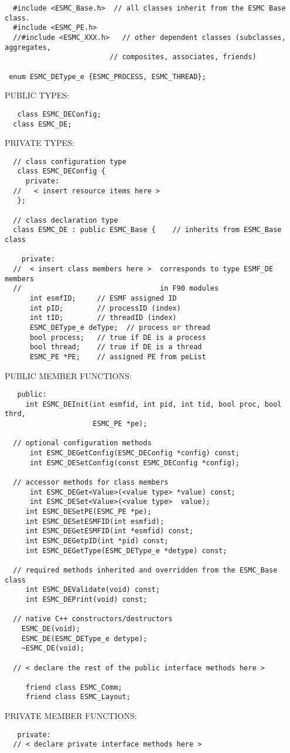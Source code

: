 \begin{verbatim}  #include <ESMC_Base.h>  // all classes inherit from the ESMC Base class.
  #include <ESMC_PE.h> 
  //#include <ESMC_XXX.h>   // other dependent classes (subclasses, aggregates,
                         // composites, associates, friends)
 
 enum ESMC_DEType_e {ESMC_PROCESS, ESMC_THREAD};
 \end{verbatim}{\sf PUBLIC TYPES:}
\begin{verbatim}   class ESMC_DEConfig;
  class ESMC_DE;
 \end{verbatim}{\sf PRIVATE TYPES:}
\begin{verbatim} 
  // class configuration type
   class ESMC_DEConfig {
     private:
  //   < insert resource items here >
   };
 
  // class declaration type
  class ESMC_DE : public ESMC_Base {    // inherits from ESMC_Base class
 
    private:
  //  < insert class members here >  corresponds to type ESMF_DE members
  //                                 in F90 modules
      int esmfID;     // ESMF assigned ID
      int pID;        // processID (index)
      int tID;        // threadID (index)
      ESMC_DEType_e deType;  // process or thread
      bool process;   // true if DE is a process
      bool thread;    // true if DE is a thread
      ESMC_PE *PE;    // assigned PE from peList
 \end{verbatim}{\sf PUBLIC MEMBER FUNCTIONS:}
\begin{verbatim}   public:
     int ESMC_DEInit(int esmfid, int pid, int tid, bool proc, bool thrd,
                     ESMC_PE *pe);
 
  // optional configuration methods
      int ESMC_DEGetConfig(ESMC_DEConfig *config) const;
      int ESMC_DESetConfig(const ESMC_DEConfig *config);
 
  // accessor methods for class members
      int ESMC_DEGet<Value>(<value type> *value) const;
      int ESMC_DESet<Value>(<value type>  value);
     int ESMC_DESetPE(ESMC_PE *pe);
     int ESMC_DESetESMFID(int esmfid);
     int ESMC_DEGetESMFID(int *esmfid) const;
     int ESMC_DEGetpID(int *pid) const;
     int ESMC_DEGetType(ESMC_DEType_e *detype) const;
     
  // required methods inherited and overridden from the ESMC_Base class
     int ESMC_DEValidate(void) const;
     int ESMC_DEPrint(void) const;
 
  // native C++ constructors/destructors
 	ESMC_DE(void);
 	ESMC_DE(ESMC_DEType_e detype);
 	~ESMC_DE(void);
   
  // < declare the rest of the public interface methods here >
 
     friend class ESMC_Comm;
     friend class ESMC_Layout;
   \end{verbatim}{\sf PRIVATE MEMBER FUNCTIONS:}
\begin{verbatim}   private: 
  // < declare private interface methods here >\end{verbatim}

